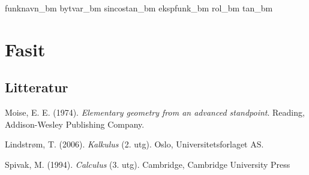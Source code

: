 	{funknavn_bm}
	{bytvar_bm}
	{sincostan_bm}	
	{ekspfunk_bm}
	{rol_bm}	
	{tan_bm}
	
	{\printindex {}
		}
	
	\chapter*{Fasit}
	
	


	

	
	\newpage
	\section*{Litteratur}
	Moise, E. E. (1974). \textit{Elementary geometry from an advanced standpoint}. Reading, Addison-Wesley Publishing Company.\vsk
	
	Lindstrøm, T. (2006). \textit{Kalkulus} (2. utg). Oslo, Universitetsforlaget AS.\vsk
	
	Spivak, M. (1994). \textit{Calculus} (3. utg). Cambridge, Cambridge University Press
	
	


